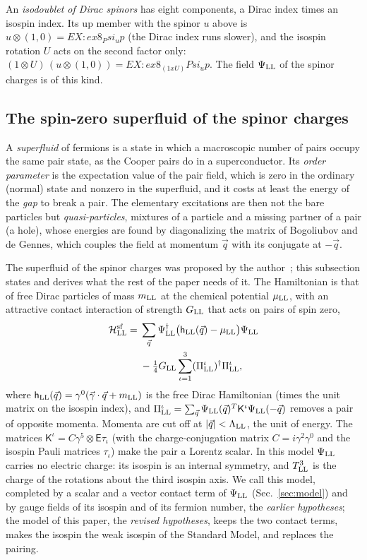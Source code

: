 \documentclass[aps,prd,twocolumn,superscriptaddress,nofootinbib,floatfix,longbibliography]{revtex4-2}
\newcommand{\LL}{{\rm LL}}
\begin{document}
An \emph{isodoublet of Dirac spinors} has eight components, a Dirac index times an isospin index. Its up member with the
spinor $u$ above is $u\otimes(1,0)={{EX:ex8_Psi_up}}$ (the Dirac index runs slower), and the isospin rotation $U$ acts
on the second factor only: $(1\otimes U)\,(u\otimes(1,0))={{EX:ex8_(1xU)Psi_up}}$. The field $\Psi_\LL$ of the spinor
charges is of this kind.

\subsection{The spin-zero superfluid of the spinor charges}
\label{sec:sf}

A \emph{superfluid} of fermions is a state in which a macroscopic number of pairs occupy the same pair state, as the
Cooper pairs do in a superconductor. Its \emph{order parameter} is the expectation value of the pair field, which is zero
in the ordinary (normal) state and nonzero in the superfluid, and it costs at least the energy of the \emph{gap} to break
a pair. The elementary excitations are then not the bare particles but \emph{quasi-particles}, mixtures of a particle and
a missing partner of a pair (a hole), whose energies are found by diagonalizing the matrix of Bogoliubov and de Gennes,
which couples the field at momentum $\vec q$ with its conjugate at $-\vec q$.

The superfluid of the spinor charges was proposed by the author~\cite{Nash2026}; this subsection states and derives what
the rest of the paper needs of it. The Hamiltonian is that of free Dirac particles of mass $m_\LL$ at the chemical
potential $\mu_\LL$, with an attractive contact interaction of strength $G_\LL$ that acts on pairs of spin zero,
\begin{equation}
\begin{split}
\mathcal H^{\rm sf}_\LL={}&\sum_{\vec q}\Psi_\LL^\dagger\big(\mathsf h_\LL(\vec q)-\mu_\LL\big)\Psi_\LL\\
&-\tfrac14G_\LL\sum_{\iota=1}^3(\Pi^\iota_\LL)^\dagger\Pi^\iota_\LL ,
\end{split}
\label{eq:hsf}
\end{equation}
where $\mathsf h_\LL(\vec q)=\gamma^0(\vec\gamma\cdot\vec q+m_\LL)$ is the free Dirac Hamiltonian (times the unit
matrix on the isospin index), and $\Pi^\iota_\LL=\sum_{\vec q}\Psi_\LL(\vec q)^T\mathsf K^\iota\Psi_\LL(-\vec q)$ removes a
pair of opposite momenta. Momenta are cut off at $|\vec q|<\Lambda_\LL$, the unit of energy. The matrices $\mathsf
K^\iota=C\gamma^5\otimes\mathsf E\tau_\iota$ (with the charge-conjugation matrix $C=i\gamma^2\gamma^0$ and the isospin
Pauli matrices $\tau_\iota$) make the pair a Lorentz scalar. In this model $\Psi_\LL$ carries no electric charge: its
isospin is an internal symmetry, and $T^3_\LL$ is the charge of the rotations about the third isospin axis. We call this
model, completed by a scalar and a vector contact term of $\Psi_\LL$ (Sec.~\ref{sec:model}) and by gauge fields of its
isospin and of its fermion number, the \emph{earlier hypotheses}; the model of this paper, the \emph{revised hypotheses},
keeps the two contact terms, makes the isospin the weak isospin of the Standard Model, and replaces the pairing.
\end{document}
